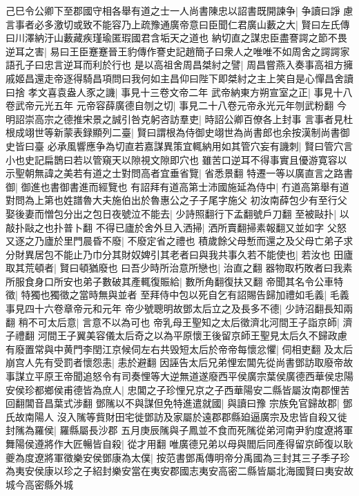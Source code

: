 己巳令公卿下至郡國守相各舉有道之士一人尚書陳忠以詔書既開諫争|{
	争讀曰諍}
慮言事者必多激切或致不能容乃上疏豫通廣帝意曰臣聞仁君廣山藪之大|{
	賢曰左氏傳曰川澤納汙山藪藏疾瑾瑜匿瑕國君含垢天之道也}
納切直之謀忠臣盡謇諤之節不畏逆耳之害|{
	易曰王臣蹇蹇晉王豹傳作謇史記趙簡子曰衆人之唯唯不如周舍之諤諤家語孔子曰忠言逆耳而利於行也}
是以高祖舍周昌桀紂之譬|{
	周昌嘗燕入奏事高祖方擁戚姬昌還走帝逐得騎昌項問曰我何如主昌仰曰陛下即桀紂之主上笑自是心憚昌舍讀曰捨}
孝文喜袁盎人豕之譏|{
	事見十三卷文帝二年}
武帝納東方朔宣室之正|{
	事見十八卷武帝元光五年}
元帝容薛廣德自刎之切|{
	事見二十八卷元帝永光元年刎武粉翻}
今明詔崇高宗之德推宋景之誠引咎克躬咨訪羣吏|{
	時詔公卿百僚各上封事}
言事者見杜根成翊世等新蒙表録顯列二臺|{
	賢曰謂根為侍御史翊世為尚書郎也余按漢制尚書御史皆曰臺}
必承風響應争為切直若嘉謀異策宜輒納用如其管穴妄有譏刺|{
	賢曰管穴言小也史記扁鵲曰若以管窺天以隙視文隙即穴也}
雖苦口逆耳不得事實且優游寛容以示聖朝無諱之美若有道之士對問高者宜垂省覽|{
	省悉景翻}
特遷一等以廣直言之路書御|{
	御進也書御書進而經覽也}
有詔拜有道高第士沛國施延為侍中|{
	冇道高第舉有道對問為上第也姓譜魯大夫施伯出於魯惠公之子子尾字施父}
初汝南薛包少有至行父娶後妻而憎包分出之包日夜號泣不能去|{
	少詩照翻行下孟翻號戶刀翻}
至被敺扑|{
	以敲扑敺之也扑普卜翻}
不得已廬於舍外旦入洒掃|{
	洒所賣翻掃素報翻又並如字}
父怒又逐之乃廬於里門晨昏不廢|{
	不廢定省之禮也}
積歲餘父母慙而還之及父母亡弟子求分財異居包不能止乃巾分其財奴婢引其老者曰與我共事久若不能使也|{
	若汝也}
田廬取其荒頓者|{
	賢曰頓猶廢也}
曰吾少時所治意所戀也|{
	治直之翻}
器物取朽敗者曰我素所服食身口所安也弟子數破其產輒復賑給|{
	數所角翻復扶又翻}
帝聞其名令公車特徵|{
	特獨也獨徵之當時無與並者}
至拜侍中包以死自乞有詔賜告歸加禮如毛義|{
	毛義事見四十六卷章帝元和元年}
帝少號聰明故鄧太后立之及長多不德|{
	少詩沼翻長知兩翻}
稍不可太后意|{
	言意不以為可也}
帝乳母王聖知之太后徵濟北河間王子詣京師|{
	濟子禮翻}
河間王子翼美容儀太后奇之以為平原懷王後留京師王聖見太后久不歸政慮有廢置常與中黄門李閏江京候伺左右共毁短太后於帝帝每懷忿懼|{
	伺相吏翻}
及太后崩宫人先有受罰者懷怨恚|{
	恚於避翻}
因誣告太后兄弟悝宏閶先從尚書鄧訪取廢帝故事謀立平原王帝聞追怒令有司奏悝等大逆無道遂廢西平侯廣宗葉侯廣德西華侯忠陽安侯珍都鄉侯甫德皆為庶人|{
	忠閶之子珍悝兄京之子西華陽安二縣皆屬汝南郡悝苦回翻閶音昌葉式涉翻}
鄧隲以不與謀但免特進遣就國|{
	與讀曰豫}
宗族免官歸故郡|{
	鄧氏故南陽人}
沒入隲等貲財田宅徙鄧訪及家屬於遠郡郡縣廹逼廣宗及忠皆自殺又徙封隲為羅侯|{
	羅縣屬長沙郡}
五月庚辰隲與子鳳並不食而死隲從弟河南尹豹度遼將軍舞陽侯遵將作大匠暢皆自殺|{
	從才用翻}
唯廣德兄弟以母與閻后同產得留京師復以耿夔為度遼將軍徵樂安侯鄧康為太僕|{
	按范書鄧禹傳明帝分禹國為三封其三子季子珍為夷安侯康以珍之子紹封樂安當在夷安郡國志夷安高密二縣皆屬北海國賢曰夷安故城今高密縣外城}
